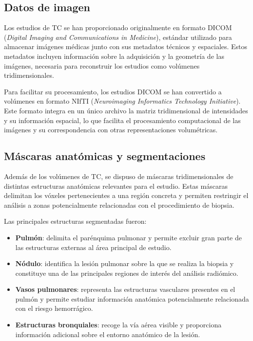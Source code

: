 \subsection{Datos de imagen}

Los estudios de TC se han proporcionado originalmente en formato DICOM (\textit{Digital Imaging and Communications in Medicine}), estándar utilizado para almacenar imágenes médicas junto con sus metadatos técnicos y espaciales. Estos metadatos incluyen información sobre la adquisición y la geometría de las imágenes, necesaria para reconstruir los estudios como volúmenes tridimensionales.

Para facilitar su procesamiento, los estudios DICOM se han convertido a volúmenes en formato NIfTI (\textit{Neuroimaging Informatics Technology Initiative}). Este formato integra en un único archivo la matriz tridimensional de intensidades y su información espacial, lo que facilita el procesamiento computacional de las imágenes y su correspondencia con otras representaciones volumétricas.

\subsection{Máscaras anatómicas y segmentaciones}

Además de los volúmenes de TC, se dispuso de máscaras tridimensionales de distintas estructuras anatómicas relevantes para el estudio. Estas máscaras delimitan los vóxeles pertenecientes a una región concreta y permiten restringir el análisis a zonas potencialmente relacionadas con el procedimiento de biopsia.

Las principales estructuras segmentadas fueron:

\begin{itemize}[itemsep=2pt, topsep=4pt]
\item \textbf{Pulmón}: delimita el parénquima pulmonar y permite excluir gran parte de las estructuras externas al área principal de estudio.
\item \textbf{Nódulo}: identifica la lesión pulmonar sobre la que se realiza la biopsia y constituye una de las principales regiones de interés del análisis radiómico.
\item \textbf{Vasos pulmonares}: representa las estructuras vasculares presentes en el pulmón y permite estudiar información anatómica potencialmente relacionada con el riesgo hemorrágico.
\item \textbf{Estructuras bronquiales}: recoge la vía aérea visible y proporciona información adicional sobre el entorno anatómico de la lesión.
\end{itemize}

